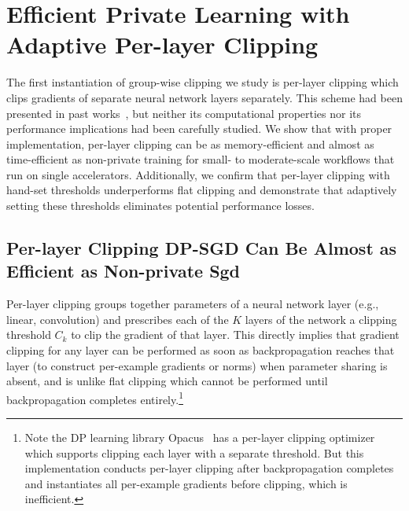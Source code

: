 


\section{Efficient Private Learning with Adaptive Per-layer Clipping} \label{sec:benefit-loss}
The first instantiation of group-wise clipping we study is per-layer clipping which clips gradients of separate neural network layers separately.
This scheme had been presented in past works~\citep{mcmahan2018general,mcmahan2018learning,dupuy2022efficient},
but neither its computational properties nor its performance implications had been carefully studied.
We show that with proper implementation, per-layer clipping can be as memory-efficient and almost as time-efficient as non-private training for small- to moderate-scale workflows that run on single accelerators.
Additionally, we confirm that per-layer clipping with hand-set thresholds underperforms flat clipping and demonstrate that adaptively setting these thresholds eliminates potential performance losses. 


\subsection{Per-layer Clipping DP-SGD Can Be Almost as Efficient as Non-private Sgd}
Per-layer clipping groups together parameters of a neural network layer (e.g., linear, convolution) and prescribes each of the $K$ layers of the network a clipping threshold $C_k$ to clip the gradient of that layer. This directly implies that gradient clipping for any layer can be performed as soon as backpropagation reaches that layer (to construct per-example gradients or norms) when parameter sharing is absent, and is unlike flat clipping which cannot be performed until backpropagation completes entirely.\footnote{Note the DP learning library Opacus~\citep{yousefpour2021opacus} has a per-layer clipping optimizer which supports clipping each layer with a separate threshold. But this implementation conducts per-layer clipping after backpropagation completes and instantiates all per-example gradients before clipping, which is inefficient.
}

